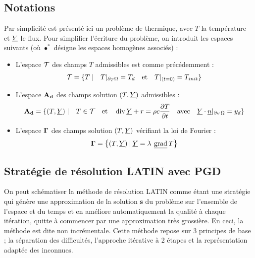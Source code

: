 \documentclass[12pt,a4paper]{report}
\begin{document}
\subsection{Notations}\label{not_latin}
Par simplicité est présenté ici un problème de thermique, avec $T$ la température et $\underline{Y}$ le flux.
Pour simplifier l'écriture du problème, on introduit les espaces suivants (où $\bullet^*$ désigne les espaces homogènes associés) :\\
\begin{itemize}

\item L'espace $\mathcal{T}$ des champs $T$ admissibles est comme précédemment :
 \begin{equation}
\mathcal{T} = \{ T \; | \quad T|_{ \partial_{T} \Omega} = T_d \quad \textrm{et} \quad T|_{(t=0)} = T_{init} \}
\end{equation}

\item L'espace $\mathbf{A_d}$ des champs solution $(T, \underline{Y})$ admissibles :
 \begin{equation}
\Ad = \{ (T, \Ys) \; | \quad T \in \CA \quad \textrm{et} \quad  \diver{\Ys}+r = \mvol \capa \frac{\partial T}{\partial t} \quad \textrm{avec} \quad  \Ys  \cdot  \underline{n}|_{ \bordY } = y_d   \}
\end{equation}

\item L'espace $\mbox{$\boldsymbol{\Gamma}$}$ des champs solution $(T, \underline{Y})$ vérifiant la loi de Fourier :
 \begin{equation}
 \Comp = \left\{ (T, \Ys) \: | \: \underline{Y} = \conduc \:  \gradv{T} \right \}
\end{equation}

\end{itemize}


\subsection{Stratégie de résolution LATIN avec PGD}

On peut schématiser la méthode de résolution LATIN comme étant une stratégie qui génère une approximation de la solution $\mathbf{s}$ du problème sur l'ensemble de l'espace et du temps et en améliore automatiquement la qualité à chaque itération, quitte à commencer par une approximation très grossière. En ceci, la méthode est dite non incrémentale.
Cette méthode repose sur 3 principes de base ; la séparation des difficultés, l'approche itérative à 2 étapes et la représentation adaptée des inconnues.\\
\end{document}
